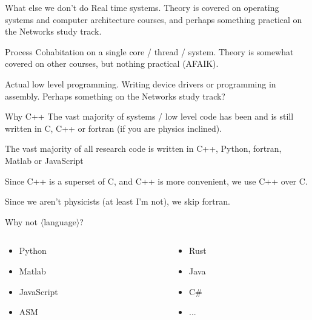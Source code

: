 \documentclass[11pt, aspectratio=169, table]{beamer}
\begin{document}
\begin{frame}{What else we don't do}
\setlength\parskip{\fill}\pause
Real time systems. Theory is covered on operating systems and computer architecture courses, and perhaps something practical 
on the Networks study track.

Process Cohabitation on a single core / thread / system. Theory is somewhat covered on other courses, but nothing practical (AFAIK).

Actual low level programming. Writing device drivers or programming in assembly. Perhaps something on the Networks study track?
\end{frame}

\begin{frame}{Why C++}
\setlength\parskip{\fill}\pause
The vast majority of systems / low level code has been and is still written in C, C++ or fortran (if you are physics inclined).

The vast majority of all research code is written in C++, Python, fortran, Matlab or JavaScript

Since C++ is a superset of C, and C++ is more convenient, we use C++ over C.

Since we aren't physicists (at least I'm not), we skip fortran.
\end{frame}

\begin{frame}{Why not $\langle$language$\rangle$?}
\begin{columns}
\begin{column}{0.5\textwidth}
\begin{itemize}
	\item Python
	\item Matlab
	\item JavaScript
	\item ASM
\end{itemize}
\end{column}
\begin{column}{0.5\textwidth}
\begin{itemize}
	\item Rust
	\item Java
	\item C\#
	\item ...
\end{itemize}
\end{column}
\end{columns}
\end{frame}
\end{document}
